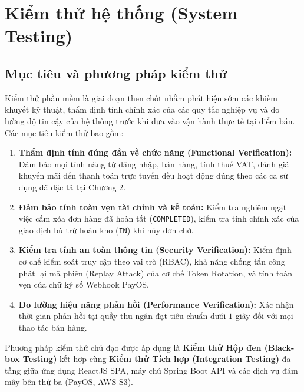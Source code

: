 
\section{Kiểm thử hệ thống (System Testing)}
\label{sec:kiem_thu_he_thong}

\subsection{Mục tiêu và phương pháp kiểm thử}
Kiểm thử phần mềm là giai đoạn then chốt nhằm phát hiện sớm các khiếm khuyết kỹ thuật, thẩm định tính chính xác của các quy tắc nghiệp vụ và đo lường độ tin cậy của hệ thống trước khi đưa vào vận hành thực tế tại điểm bán. Các mục tiêu kiểm thử bao gồm:
\begin{enumerate}[label=\arabic*., leftmargin=1.5cm]
    \item \textbf{Thẩm định tính đúng đắn về chức năng (Functional Verification):} Đảm bảo mọi tính năng từ đăng nhập, bán hàng, tính thuế VAT, đánh giá khuyến mãi đến thanh toán trực tuyến đều hoạt động đúng theo các ca sử dụng đã đặc tả tại Chương 2.
    \item \textbf{Đảm bảo tính toàn vẹn tài chính và kế toán:} Kiểm tra nghiêm ngặt việc cấm xóa đơn hàng đã hoàn tất (\texttt{COMPLETED}), kiểm tra tính chính xác của giao dịch bù trừ hoàn kho (\texttt{IN}) khi hủy đơn chờ.
    \item \textbf{Kiểm tra tính an toàn thông tin (Security Verification):} Kiểm định cơ chế kiểm soát truy cập theo vai trò (RBAC), khả năng chống tấn công phát lại mã phiên (Replay Attack) của cơ chế Token Rotation, và tính toàn vẹn của chữ ký số Webhook PayOS.
    \item \textbf{Đo lường hiệu năng phản hồi (Performance Verification):} Xác nhận thời gian phản hồi tại quầy thu ngân đạt tiêu chuẩn dưới $1$ giây đối với mọi thao tác bán hàng.
\end{enumerate}

Phương pháp kiểm thử chủ đạo được áp dụng là \textbf{Kiểm thử Hộp đen (Black-box Testing)} kết hợp cùng \textbf{Kiểm thử Tích hợp (Integration Testing)} đa tầng giữa ứng dụng ReactJS SPA, máy chủ Spring Boot API và các dịch vụ đám mây bên thứ ba (PayOS, AWS S3).


